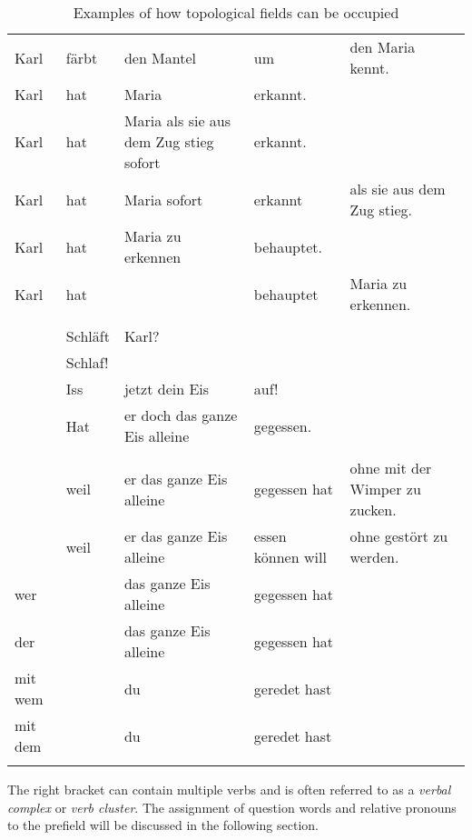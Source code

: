 {\begin{table}
\begin{sideways}
\begin{tabular}{lllll}
Karl    & färbt         & den Mantel                             & um             & den Maria kennt.           \\
Karl    & hat           & Maria                                  & erkannt.                                    \\
Karl    & hat           & Maria als sie aus dem Zug stieg sofort & erkannt.                                    \\
Karl    & hat           & Maria sofort                           & erkannt        & als sie aus dem Zug stieg. \\
Karl    & hat           & Maria zu erkennen                      & behauptet.                                  \\
Karl    & hat           &                                        & behauptet      & Maria zu erkennen.         \\ \\
        & Schläft       & Karl?                                                                                \\
        & Schlaf!                                                                                              \\
        & Iss           & jetzt dein Eis                         & auf!                                        \\
        & Hat           & er doch das ganze Eis alleine          & gegessen.                                   \\  \\
        & weil          & er das ganze Eis alleine               & gegessen hat   & ohne mit der Wimper zu zucken.    \\
        & weil          & er das ganze Eis alleine               & essen können will   & ohne gestört zu werden.    \\
wer     &               & das ganze Eis alleine                  & gegessen hat \\
der     &               & das ganze Eis alleine                  & gegessen hat \\
mit wem &               & du                                     & geredet hast\\
mit dem &               & du                                     & geredet hast\\\lspbottomrule
\end{tabular}
\end{sideways}
\caption{\label{bsp-topo}Examples of how topological fields can be occupied}
\end{table}
The right bracket can contain multiple verbs and is often referred to as a \emph{verbal complex} or \emph{verb cluster}.
The assignment of question words and relative pronouns to the prefield will be discussed in the following section.

}
